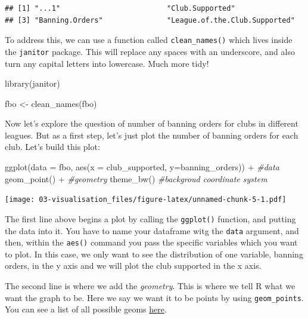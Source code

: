 \documentclass[
]{book}
\newenvironment{Shaded}{\begin{snugshade}}{\end{snugshade}}
\newcommand{\AttributeTok}[1]{\textcolor[rgb]{0.77,0.63,0.00}{#1}}
\newcommand{\CommentTok}[1]{\textcolor[rgb]{0.56,0.35,0.01}{\textit{#1}}}
\newcommand{\FunctionTok}[1]{\textcolor[rgb]{0.00,0.00,0.00}{#1}}
\newcommand{\NormalTok}[1]{#1}
\newcommand{\OtherTok}[1]{\textcolor[rgb]{0.56,0.35,0.01}{#1}}
\newcommand{\SpecialCharTok}[1]{\textcolor[rgb]{0.00,0.00,0.00}{#1}}
\begin{document}
\begin{verbatim}
## [1] "...1"                         "Club.Supported"              
## [3] "Banning.Orders"               "League.of.the.Club.Supported"
\end{verbatim}

To address this, we can use a function called \texttt{clean\_names()} which lives inside the \texttt{janitor} package. This will replace any spaces with an underscore, and also turn any capital letters into lowercase. Much more tidy!

\begin{Shaded}
\begin{Highlighting}[]
\FunctionTok{library}\NormalTok{(janitor)}

\NormalTok{fbo }\OtherTok{\textless{}{-}} \FunctionTok{clean\_names}\NormalTok{(fbo)}
\end{Highlighting}
\end{Shaded}

Now let's explore the question of number of banning orders for clubs in different leagues. But as a first step, let's just plot the number of banning orders for each club. Let's build this plot:

\begin{Shaded}
\begin{Highlighting}[]
\FunctionTok{ggplot}\NormalTok{(}\AttributeTok{data =}\NormalTok{ fbo, }\FunctionTok{aes}\NormalTok{(}\AttributeTok{x =}\NormalTok{ club\_supported, }\AttributeTok{y=}\NormalTok{banning\_orders)) }\SpecialCharTok{+} \CommentTok{\#data}
   \FunctionTok{geom\_point}\NormalTok{() }\SpecialCharTok{+}                 \CommentTok{\#geometry}
  \FunctionTok{theme\_bw}\NormalTok{()                     }\CommentTok{\#backgroud coordinate system}
\end{Highlighting}
\end{Shaded}

\texttt{[image: 03-visualisation\_files/figure-latex/unnamed-chunk-5-1.pdf]}

The first line above begins a plot by calling the \texttt{ggplot()} function, and putting the data into it. You have to name your dataframe witg the \texttt{data} argument, and then, within the \texttt{aes()} command you pass the specific variables which you want to plot. In this case, we only want to see the distribution of one variable, banning orders, in the y axis and we will plot the club supported in the x axis.

The second line is where we add the \emph{geometry}. This is where we tell R what we want the graph to be. Here we say we want it to be points by using \texttt{geom\_points}. You can see a list of all possible geoms \href{http://docs.ggplot2.org/current/}{here}.
\end{document}
